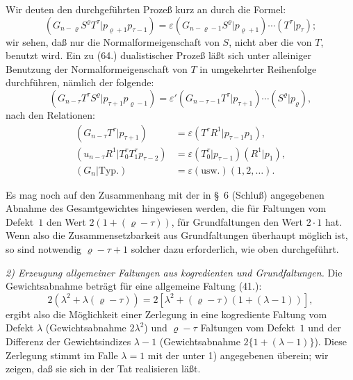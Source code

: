 \documentclass[12pt,a4paper]{article}
\begin{document}
Wir deuten den durchgeführten Prozeß kurz an durch die Formel:
\begin{equation}\tag{64}
(G_{n-\varrho} S^{\varrho} T^{\tau} | p_{\varrho+1} p_{\tau-1}) = \varepsilon (G_{n-\varrho-1} S^{\varrho} | p_{\varrho+1}) \cdots (T^{\tau} | p_{\tau});
\end{equation}
wir sehen, daß nur die Normalformeigenschaft von $S$, nicht aber die von $T$, benutzt wird. Ein zu (64.) dualistischer Prozeß läßt sich unter alleiniger Benutzung der Normalformeigenschaft von $T$ in umgekehrter Reihenfolge durchführen, nämlich der folgende:
\begin{equation}\tag{65}
(G_{n-\tau} T^{\tau} S^{\varrho} | p_{\tau+1} p_{\varrho-1}) = \varepsilon' (G_{n-\tau-1} T^{\tau} | p_{\tau+1}) \cdots (S^{\varrho} | p_{\varrho}),
\end{equation}
nach den Relationen:
\begin{align*}
(G_{n-\tau} T^{\tau} | p_{\tau+1}) &= \varepsilon (T^{\tau} R^{1} | p_{\tau-1} p_{1}), \\
(u_{n-\tau} R^{1} | T^{\tau}_{0} T^{\tau}_{1} p_{\tau-2}) &= \varepsilon (T^{\tau}_{0} | p_{\tau-1}) (R^{1} | p_{1}), \\
(G_{n} | \text{Typ.}) &= \varepsilon (\text{usw.}) (1, 2, \ldots).
\end{align*}

Es mag noch auf den Zusammenhang mit der in \S\ 6 (Schluß) angegebenen Abnahme des Gesamtgewichtes hingewiesen werden, die für Faltungen vom Defekt~$1$ den Wert $2(1+(\varrho-\tau))$, für Grundfaltungen den Wert $2 \cdot 1$ hat. Wenn also die Zusammensetzbarkeit aus Grundfaltungen überhaupt möglich ist, so sind notwendig $\varrho-\tau+1$ solcher dazu erforderlich, wie oben durchgeführt.

\textit{2) Erzeugung allgemeiner Faltungen aus kogredienten und Grundfaltungen.} Die Gewichtsabnahme beträgt für eine allgemeine Faltung (41.):
\begin{equation*}
2(\lambda^{2} + \lambda(\varrho-\tau)) = 2[\lambda^{2} + (\varrho-\tau)(1+(\lambda-1))],
\end{equation*}
ergibt also die Möglichkeit einer Zerlegung in eine kogrediente Faltung vom Defekt $\lambda$ (Gewichtsabnahme $2\lambda^{2}$) und $\varrho-\tau$ Faltungen vom Defekt~$1$ und der Differenz der Gewichtsindizes $\lambda-1$ (Gewichtsabnahme $2\{1+(\lambda-1)\}$). Diese Zerlegung stimmt im Falle $\lambda=1$ mit der unter 1) angegebenen überein; wir zeigen, daß sie sich in der Tat realisieren läßt.
\end{document}
